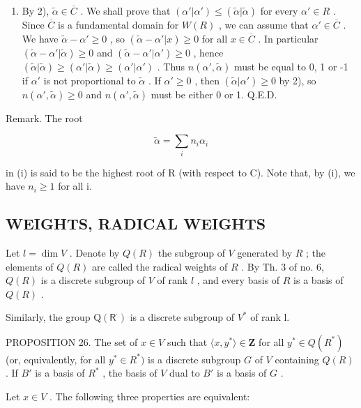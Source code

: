 \begin{enumerate}
\def\labelenumi{\arabic{enumi})}
\setcounter{enumi}{4}
\tightlist
\item
  By 2), \(\tilde{\alpha} \in \overline{C}\) . We shall prove that \((\alpha'|\alpha') \leqslant (\tilde{\alpha}|\tilde{\alpha})\) for every \(\alpha' \in R\) . Since \(\overline{C}\) is a fundamental domain for \(W(R)\) , we can assume that \(\alpha' \in \overline{C}\) . We have \(\tilde{\alpha} - \alpha' \geqslant 0\) , so \((\tilde{\alpha} - \alpha' | x) \geqslant 0\) for all \(x \in \overline{C}\) . In particular \((\tilde{\alpha} - \alpha' |\tilde{\alpha}) \geqslant 0\) and \((\tilde{\alpha} - \alpha' |\alpha') \geqslant 0\) , hence \((\tilde{\alpha}|\tilde{\alpha}) \geqslant (\alpha'|\tilde{\alpha}) \geqslant (\alpha'|\alpha')\) . Thus \(n(\alpha',\tilde{\alpha})\) must be equal to 0, 1 or -1 if \(\alpha'\) is not proportional to \(\tilde{\alpha}\) . If \(\alpha' \geqslant 0\) , then \((\tilde{\alpha}|\alpha') \geqslant 0\) by 2), so \(n(\alpha',\tilde{\alpha}) \geqslant 0\) and \(n(\alpha',\tilde{\alpha})\) must be either 0 or 1. Q.E.D.
\end{enumerate}

Remark. The root

\[
\tilde {\alpha} = \sum_ {i} n _ {i} \alpha_ {i}
\]

in (i) is said to be the highest root of R (with respect to C). Note that, by (i), we have \(n_{i} \geqslant 1\) for all i.

\subsection{WEIGHTS, RADICAL WEIGHTS}

Let \(l = \dim V\) . Denote by \(Q(R)\) the subgroup of \(V\) generated by \(R\) ; the elements of \(Q(R)\) are called the radical weights of \(R\) . By Th. 3 of no. 6, \(Q(R)\) is a discrete subgroup of \(V\) of rank \(l\) , and every basis of \(R\) is a basis of \(Q(R)\) .

Similarly, the group \(\mathrm{Q}(\mathsf{R}^{\cdot})\) is a discrete subgroup of \(V^{*}\) of rank l.

PROPOSITION 26. The set of \(x \in V\) such that \(\langle x, y^* \rangle \in \mathbf{Z}\) for all \(y^* \in Q(R^*)\) (or, equivalently, for all \(y^* \in R^*)\) is a discrete subgroup \(G\) of \(V\) containing \(Q(R)\) . If \(B'\) is a basis of \(R^*\) , the basis of \(V\) dual to \(B'\) is a basis of \(G\) .

Let \(x \in V\) . The following three properties are equivalent:

